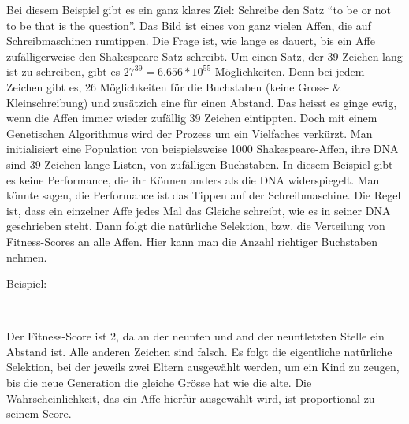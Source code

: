 \documentclass[11pt,a4paper,ngerman]{article}
\begin{document}
Bei diesem Beispiel gibt es ein ganz klares Ziel: Schreibe den Satz \enquote{to be or not to be that is the question}. Das Bild ist eines von ganz vielen Affen, die auf Schreibmaschinen rumtippen. Die Frage ist, wie lange es dauert, bis ein Affe zufälligerweise den Shakespeare-Satz schreibt. Um einen Satz, der 39 Zeichen lang ist zu schreiben, gibt es $ 27^{39} = 6.656* 10^{55}$ Möglichkeiten. Denn bei jedem Zeichen gibt es, 26 Möglichkeiten für die Buchstaben (keine Gross- \& Kleinschreibung) und zusätzich eine für einen Abstand. Das heisst es ginge ewig, wenn die Affen immer wieder zufällig 39 Zeichen eintippten. Doch mit einem Genetischen Algorithmus wird der Prozess um ein Vielfaches verkürzt. Man initialisiert eine Population von beispielsweise 1000 Shakespeare-Affen, ihre DNA sind 39 Zeichen lange Listen, von zufälligen Buchstaben. In diesem Beispiel gibt es keine Performance, die ihr Können anders als die DNA widerspiegelt. Man könnte sagen, die Performance ist das Tippen auf der Schreibmaschine. Die Regel ist, dass ein einzelner Affe jedes Mal das Gleiche schreibt, wie es in seiner DNA geschrieben steht. Dann folgt die natürliche Selektion, bzw. die Verteilung von Fitness-Scores an alle Affen. Hier kann man die Anzahl richtiger Buchstaben nehmen.

\bigskip
Beispiel:

\bigskip
\begin{addmargin}[2em]{0em}
\begin{center}
\\
\end{center}
\end{addmargin}

\setlength\parindent{0pt}
Der Fitness-Score ist 2, da an der neunten und and der neuntletzten Stelle ein Abstand ist. Alle anderen Zeichen sind falsch. Es folgt die eigentliche natürliche Selektion, bei der jeweils zwei Eltern ausgewählt werden, um ein Kind zu zeugen, bis die neue Generation die gleiche Grösse hat wie die alte. Die Wahrscheinlichkeit, das ein Affe hierfür ausgewählt wird, ist proportional zu seinem Score.
\end{document}
